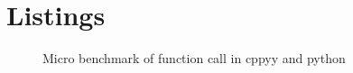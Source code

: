 \documentclass[times,specification,annotation]{itmo-student-thesis}
\begin{document}
\printmainbibliography

\appendix

\chapter{Listings}
\begin{figure}[!h]
	\caption{Micro benchmark of function call in cppyy and python}\label{apx:cppyy-bench}
	
\end{figure}
\end{document}
